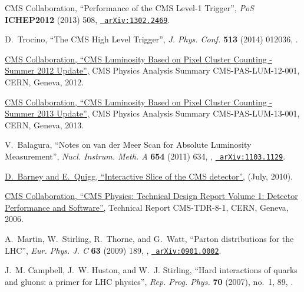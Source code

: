 \documentclass[12pt]{thesis}  %
\begin{document}
\begin{thebibliography}{100}
\hrefCMSnoop {} {{ CMS} Collaboration, ``{Performance of the CMS Level-1
  Trigger}'',} \textit{ PoS} \textbf{ ICHEP2012} (2013) 508,
\href{http://www.arXiv.org/abs/1302.2469}{\texttt{ arXiv:1302.2469}}.

\hrefCMSnoop {} {D.~Trocino, ``{The CMS High Level Trigger}'',} \textit{ J.
  Phys. Conf.} \textbf{ 513} (2014) 012036,
\href{http://dx.doi.org/10.1088/1742-6596/513/1/012036}{}.

\href {https://cds.cern.ch/record/1482193} {{ CMS} Collaboration, ``{CMS
  Luminosity Based on Pixel Cluster Counting - Summer 2012 Update}'',} CMS
  Physics Analysis Summary CMS-PAS-LUM-12-001, CERN, Geneva, 2012.

\href {https://cds.cern.ch/record/1598864} {{ CMS} Collaboration, ``{CMS
  Luminosity Based on Pixel Cluster Counting - Summer 2013 Update}'',} CMS
  Physics Analysis Summary CMS-PAS-LUM-13-001, CERN, Geneva, 2013.

\hrefCMSnoop {} {V.~Balagura, ``{Notes on van der Meer Scan for Absolute
  Luminosity Measurement}'',} \textit{ Nucl. Instrum. Meth. A} \textbf{ 654}
  (2011) 634,
  \href{http://dx.doi.org/10.1016/j.nima.2011.06.007}{},
\href{http://www.arXiv.org/abs/1103.1129}{\texttt{ arXiv:1103.1129}}.

\href {https://cms-docdb.cern.ch/cgi-bin/PublicDocDB/ShowDocument?docid=4172}
  {D.~Barney and E.~Quigg, ``{Interactive Slice of the CMS detector}'',} (July,
  2010).

\href {https://cds.cern.ch/record/922757} {{ CMS} Collaboration, ``{CMS
  Physics: Technical Design Report Volume 1: Detector Performance and
  Software}'',} Technical Report CMS-TDR-8-1, CERN, Geneva, 2006.

\hrefCMSnoop {} {A.~Martin, W.~Stirling, R.~Thorne, and G.~Watt, ``Parton
  distributions for the LHC'',} \textit{ Eur. Phys. J. C} \textbf{ 63} (2009)
  189,
  \href{http://dx.doi.org/10.1140/epjc/s10052-009-1072-5}{},
  \href{http://www.arXiv.org/abs/0901.0002}{\texttt{ arXiv:0901.0002}}.

\hrefCMSnoop {} {J.~M. Campbell, J.~W. Huston, and W.~J. Stirling, ``Hard
  interactions of quarks and gluons: a primer for LHC physics'',} \textit{ Rep.
  Prog. Phys.} \textbf{ 70} (2007), no.~1, 89,
  \href{http://dx.doi.org/10.1088/0034-4885/70/1/R02}{}.


\end{thebibliography}
\end{document}
